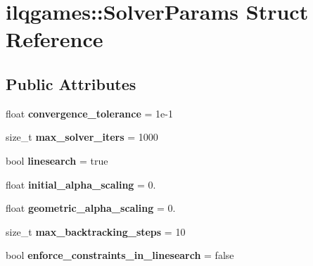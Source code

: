 \hypertarget{structilqgames_1_1_solver_params}{}\section{ilqgames\+:\+:Solver\+Params Struct Reference}
\label{structilqgames_1_1_solver_params}
\subsection*{Public Attributes}
\begin{DoxyCompactItemize}
\item 
float {\bfseries convergence\+\_\+tolerance} = 1e-\/1\hypertarget{structilqgames_1_1_solver_params_afe3985198f617a446e43e3d3a3c6ed2e}{}\label{structilqgames_1_1_solver_params_afe3985198f617a446e43e3d3a3c6ed2e}

\item 
size\+\_\+t {\bfseries max\+\_\+solver\+\_\+iters} = 1000\hypertarget{structilqgames_1_1_solver_params_a525076d6ad3f90a2fc5c410d88dc090f}{}\label{structilqgames_1_1_solver_params_a525076d6ad3f90a2fc5c410d88dc090f}

\item 
bool {\bfseries linesearch} = true\hypertarget{structilqgames_1_1_solver_params_af5c0bdc01591507e9a83f686a5be8e49}{}\label{structilqgames_1_1_solver_params_af5c0bdc01591507e9a83f686a5be8e49}

\item 
float {\bfseries initial\+\_\+alpha\+\_\+scaling} = 0.\hypertarget{structilqgames_1_1_solver_params_ac4b00024e1a74f611a0aeacbcdf91719}{}\label{structilqgames_1_1_solver_params_ac4b00024e1a74f611a0aeacbcdf91719}

\item 
float {\bfseries geometric\+\_\+alpha\+\_\+scaling} = 0.\hypertarget{structilqgames_1_1_solver_params_a36f6667fd24a5c763c6e03f67acbbcb8}{}\label{structilqgames_1_1_solver_params_a36f6667fd24a5c763c6e03f67acbbcb8}

\item 
size\+\_\+t {\bfseries max\+\_\+backtracking\+\_\+steps} = 10\hypertarget{structilqgames_1_1_solver_params_ad130123c76a7b90d41cf836e275dfef0}{}\label{structilqgames_1_1_solver_params_ad130123c76a7b90d41cf836e275dfef0}

\item 
bool {\bfseries enforce\+\_\+constraints\+\_\+in\+\_\+linesearch} = false\hypertarget{structilqgames_1_1_solver_params_a7e727a43f4b6dab1c534926af31bc28d}{}\label{structilqgames_1_1_solver_params_a7e727a43f4b6dab1c534926af31bc28d}


\end{DoxyCompactItemize}
